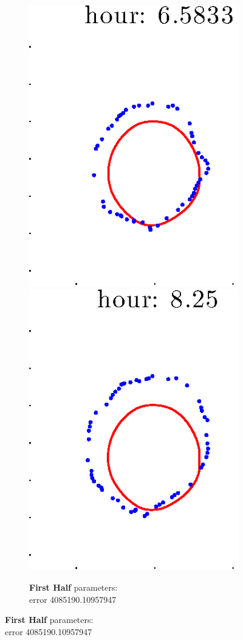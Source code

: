 \documentclass[12pt]{article}
\begin{document}
\begin{figure}[h!]
\begin{subfigure}[b]{.3\textwidth}
		\includegraphics[height=.15\textheight]{Pos14exp8/full/first5.eps}
		\includegraphics[height=.15\textheight]{Pos14exp8/full/first6.eps}
		\caption{\textbf{First Half} parameters: \\error 4085190.10957947}

\end{subfigure}
\end{figure}
\end{document}
